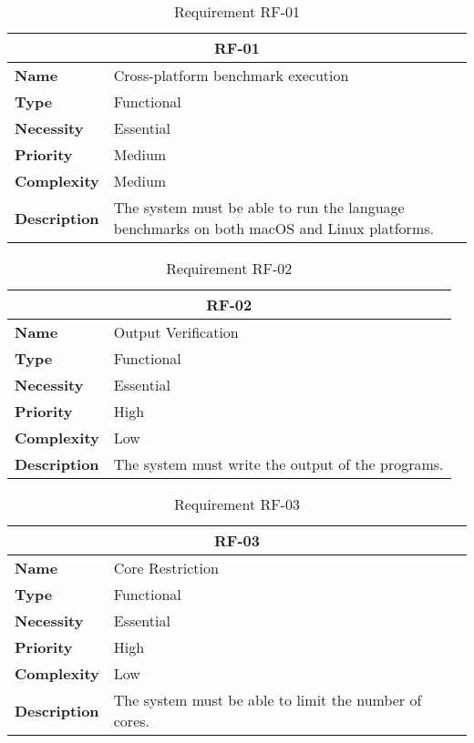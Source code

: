 \begin{table}[H]
    \centering
    \begin{tabular}{l p{10cm}}
        \toprule
        \multicolumn{2}{c}{\textbf{RF-01}} \\
        \toprule
        \textbf{Name}               & Cross-platform benchmark execution \\
        \textbf{Type}               & Functional \\
        \textbf{Necessity}          & Essential \\
        \textbf{Priority}           & Medium \\
        \textbf{Complexity}         & Medium \\
        \textbf{Description}        & The system must be able to run the language benchmarks on both macOS and Linux platforms. \\
        \bottomrule
    \end{tabular}
\caption{Requirement RF-01}\label{tab:rf-01}
\end{table}

\begin{table}[H]
    \centering
    \begin{tabular}{l p{10cm}}
        \toprule
        \multicolumn{2}{c}{\textbf{RF-02}} \\
        \toprule
        \textbf{Name}               & Output Verification \\
        \textbf{Type}               & Functional \\
        \textbf{Necessity}          & Essential \\
        \textbf{Priority}           & High \\
        \textbf{Complexity}         & Low \\
        \textbf{Description}        & The system must write the output of the programs. \\
        \bottomrule
    \end{tabular}
\caption{Requirement RF-02}\label{tab:rf-02}
\end{table}

\begin{table}[H]
    \centering
    \begin{tabular}{l p{10cm}}
        \toprule
        \multicolumn{2}{c}{\textbf{RF-03}} \\
        \toprule
        \textbf{Name}               & Core Restriction \\
        \textbf{Type}               & Functional \\
        \textbf{Necessity}          & Essential \\
        \textbf{Priority}           & High \\
        \textbf{Complexity}         & Low \\
        \textbf{Description}        & The system must be able to limit the number of cores. \\
        \bottomrule
    \end{tabular}
\caption{Requirement RF-03}\label{tab:rf-03}
\end{table}

